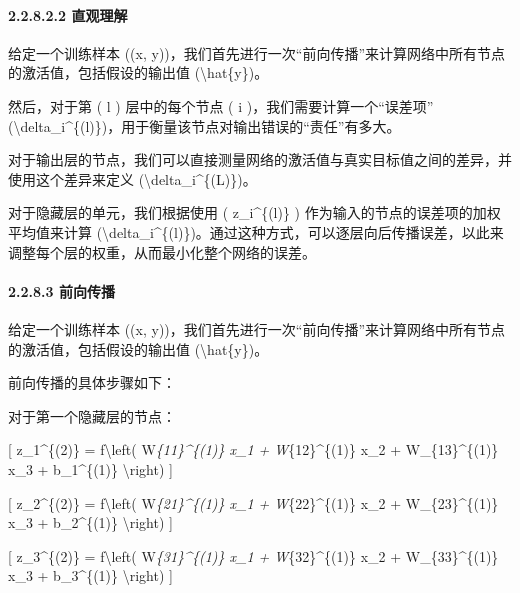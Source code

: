 \paragraph{\texorpdfstring{\textbf{2.2.8.2.2
直观理解}}{2.2.8.2.2 直观理解}}\label{22822-ux76f4ux89c2ux7406ux89e3}

给定一个训练样本 ((x,
y))，我们首先进行一次``前向传播''来计算网络中所有节点的激活值，包括假设的输出值
(\textbackslash hat\{y\})。

然后，对于第 ( l ) 层中的每个节点 ( i )，我们需要计算一个``误差项''
(\textbackslash delta\_i\^{}\{(l)\})，用于衡量该节点对输出错误的``责任''有多大。

对于输出层的节点，我们可以直接测量网络的激活值与真实目标值之间的差异，并使用这个差异来定义
(\textbackslash delta\_i\^{}\{(L)\})。

对于隐藏层的单元，我们根据使用 ( z\_i\^{}\{(l)\} )
作为输入的节点的误差项的加权平均值来计算
(\textbackslash delta\_i\^{}\{(l)\})。通过这种方式，可以逐层向后传播误差，以此来调整每个层的权重，从而最小化整个网络的误差。

\paragraph{\texorpdfstring{\textbf{2.2.8.3}
\textbf{前向传播}}{2.2.8.3 前向传播}}\label{2283-ux524dux5411ux4f20ux64ad}

给定一个训练样本 ((x,
y))，我们首先进行一次``前向传播''来计算网络中所有节点的激活值，包括假设的输出值
(\textbackslash hat\{y\})。

前向传播的具体步骤如下：


对于第一个隐藏层的节点：

{[} z\_1\^{}\{(2)\} = f\textbackslash left( W\emph{\{11\}\^{}\{(1)\}
x\_1 + W}\{12\}\^{}\{(1)\} x\_2 + W\_\{13\}\^{}\{(1)\} x\_3 +
b\_1\^{}\{(1)\} \textbackslash right) {]}

{[} z\_2\^{}\{(2)\} = f\textbackslash left( W\emph{\{21\}\^{}\{(1)\}
x\_1 + W}\{22\}\^{}\{(1)\} x\_2 + W\_\{23\}\^{}\{(1)\} x\_3 +
b\_2\^{}\{(1)\} \textbackslash right) {]}

{[} z\_3\^{}\{(2)\} = f\textbackslash left( W\emph{\{31\}\^{}\{(1)\}
x\_1 + W}\{32\}\^{}\{(1)\} x\_2 + W\_\{33\}\^{}\{(1)\} x\_3 +
b\_3\^{}\{(1)\} \textbackslash right) {]}


